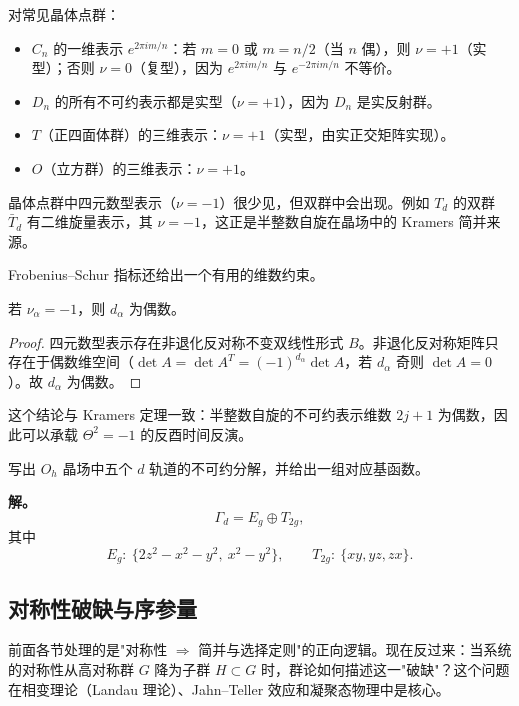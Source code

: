 \begin{example}
对常见晶体点群：
\begin{itemize}
\item $C_n$ 的一维表示 $e^{2\pi im/n}$：若 $m=0$ 或 $m=n/2$（当 $n$ 偶），则 $\nu=+1$（实型）；否则 $\nu=0$（复型），因为 $e^{2\pi im/n}$ 与 $e^{-2\pi im/n}$ 不等价。
\item $D_n$ 的所有不可约表示都是实型（$\nu=+1$），因为 $D_n$ 是实反射群。
\item $T$（正四面体群）的三维表示：$\nu=+1$（实型，由实正交矩阵实现）。
\item $O$（立方群）的三维表示：$\nu=+1$。
\end{itemize}
晶体点群中四元数型表示（$\nu=-1$）很少见，但双群中会出现。例如 $T_d$ 的双群 $\bar T_d$ 有二维旋量表示，其 $\nu=-1$，这正是半整数自旋在晶场中的 Kramers 简并来源。

\end{example}

Frobenius--Schur 指标还给出一个有用的维数约束。

\begin{proposition}[四元数型表示维数为偶数]
若 $\nu_\alpha=-1$，则 $d_\alpha$ 为偶数。
\label{prop:quaternionic-even-dim}

\end{proposition}

\begin{proof}
四元数型表示存在非退化反对称不变双线性形式 $B$。非退化反对称矩阵只存在于偶数维空间（$\det A=\det A^T=(-1)^{d_\alpha}\det A$，若 $d_\alpha$ 奇则 $\det A=0$）。故 $d_\alpha$ 为偶数。
\end{proof}

这个结论与 Kramers 定理一致：半整数自旋的不可约表示维数 $2j+1$ 为偶数，因此可以承载 $\Theta^2=-1$ 的反酉时间反演。

\begin{workedexample}
写出 $O_h$ 晶场中五个 $d$ 轨道的不可约分解，并给出一组对应基函数。

\textbf{解。}
\[
\Gamma_d=E_g\oplus T_{2g},
\]
其中
\[
E_g:\ \{2z^2-x^2-y^2,\ x^2-y^2\},
\qquad
T_{2g}:\ \{xy,yz,zx\}.
\]
\end{workedexample}


\subsection{对称性破缺与序参量}
\label{sec:symmetry-breaking}

前面各节处理的是"对称性 $\Rightarrow$ 简并与选择定则"的正向逻辑。现在反过来：当系统的对称性从高对称群 $G$ 降为子群 $H\subset G$ 时，群论如何描述这一"破缺"？这个问题在相变理论（Landau 理论）、Jahn--Teller 效应和凝聚态物理中是核心。


